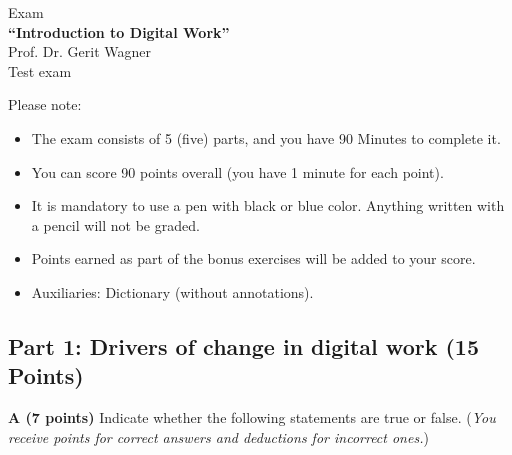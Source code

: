 \documentclass[12pt]{scrartcl}
\begin{document}
\thispagestyle{firststyle}

\begin{center}
\large{Exam}\\
\vspace{0.5cm}
\large{\textbf{"`Introduction to Digital Work"'}}\\
\vspace{0.5cm}
\large{Prof. Dr. Gerit Wagner}\\
\vspace{0.5cm}
\large{Test exam}\\
\end{center}
\vspace{3cm}

Please note:
\begin{itemize}
\item The exam consists of 5 (five) parts, and you have 90 Minutes to complete it.
\item You can score 90 points overall (you have 1 minute for each point).
\item It is mandatory to use a pen with black or blue color. Anything written with a pencil will not be graded.
\item Points earned as part of the bonus exercises will be added to your score.
\item Auxiliaries: Dictionary (without annotations).
\end{itemize}
\vspace{2cm}


\vfill

\clearpage

\subsection*{Part 1: Drivers of change in digital work (15 Points)}

\textbf{A (7 points)} Indicate whether the following statements are true or false. (\textit{You receive points for correct answers and deductions for incorrect ones.})
\end{document}
